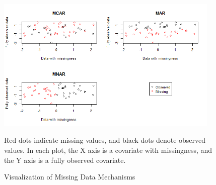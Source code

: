 \begin{figure}[!ht]
  \centering
    \includegraphics[width=0.95\textwidth]{md_mechanism}
  \caption{Visualization of Missing Data Mechanisms}
\medskip
Red dots indicate missing values, and black dots denote observed values. In each plot, the X axis is a covariate with missingness, and the Y axis is a fully observed covariate.
\label{fig:miviz}
\end{figure}


